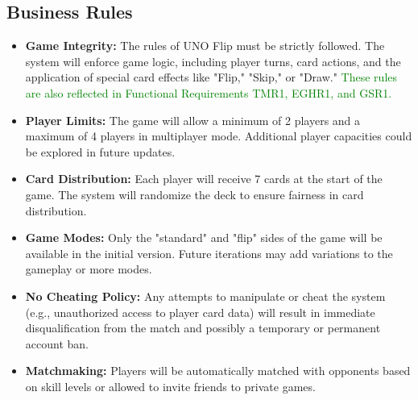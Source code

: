 \documentclass[12pt]{article}
\newcommand{\added}[1]{\textcolor{green}{#1}}
\begin{document}
\subsection{Business Rules}
\begin{itemize}
    \item \textbf{Game Integrity:} The rules of UNO Flip must be strictly followed. The system will enforce game logic, including player turns, card actions, and the application of special card effects like "Flip," "Skip," or "Draw." \added{These rules are also reflected in Functional Requirements TMR1, EGHR1, and GSR1.}
    \item \textbf{Player Limits:} The game will allow a minimum of 2 players and a maximum of 4 players in multiplayer mode. Additional player capacities could be explored in future updates.
    \item \textbf{Card Distribution:} Each player will receive 7 cards at the start of the game. The system will randomize the deck to ensure fairness in card distribution.
    \item \textbf{Game Modes:} Only the "standard" and "flip" sides of the game will be available in the initial version. Future iterations may add variations to the gameplay or more modes.
    \item \textbf{No Cheating Policy:} Any attempts to manipulate or cheat the system (e.g., unauthorized access to player card data) will result in immediate disqualification from the match and possibly a temporary or permanent account ban.
    \item \textbf{Matchmaking:} Players will be automatically matched with opponents based on skill levels or allowed to invite friends to private games.
\end{itemize}
\end{document}
